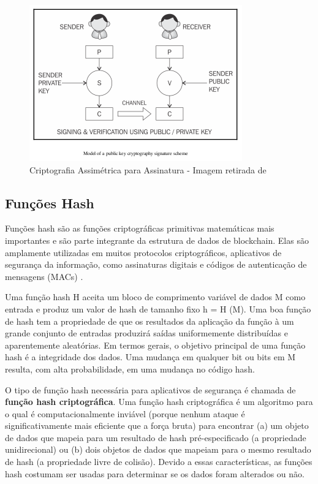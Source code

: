                     \begin{figure}[H]
                         \centering
                         \includegraphics[scale=0.7]{figuras/capitulo_2/public_private_signature.png}
                         \caption{Criptografia Assimétrica para Assinatura - Imagem retirada de \cite{mastering_blockchain}}
                         \label{fig:public_private_signature}
                    \end{figure}
                    
    \subsection{Funções Hash}
        
        Funções hash são as funções criptográficas primitivas matemáticas mais importantes e são parte integrante da estrutura de dados de blockchain. Elas são amplamente utilizadas em muitos protocolos criptográficos, aplicativos de segurança da informação, como assinaturas digitais e códigos de autenticação de mensagens (MACs) \cite{beginnig_blockchain_bikramaditya}.
        
        Uma função hash H aceita um bloco de comprimento variável de dados M como entrada e produz um valor de hash de tamanho fixo h = H (M). Uma boa função de hash tem a propriedade de que os resultados da aplicação da função à um grande conjunto de entradas produzirá saídas uniformemente distribuídas e aparentemente aleatórias. Em termos gerais, o objetivo principal de uma função hash é a integridade dos dados. Uma mudança em qualquer bit ou bits em M resulta, com alta probabilidade, em uma mudança no código hash.\cite{cryptograpy_and_network_stallings}
        
        O tipo de função hash necessária para aplicativos de segurança é chamada de \textbf{função hash criptográfica}. Uma função hash criptográfica é um algoritmo para o qual é computacionalmente inviável (porque nenhum ataque é significativamente mais eficiente que a força bruta) para encontrar (a) um objeto de dados que mapeia para um resultado de hash pré-especificado (a propriedade unidirecional) ou (b) dois objetos de dados que mapeiam para o mesmo resultado de hash (a propriedade livre de colisão). Devido a essas características, as funções hash costumam ser usadas para determinar se os dados foram alterados ou não.\cite{cryptograpy_and_network_stallings}

